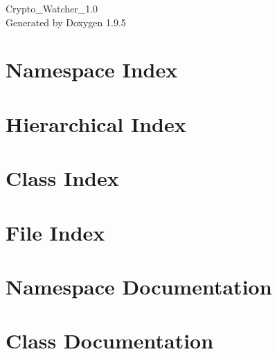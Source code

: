 \documentclass[twoside]{book}
\newcommand{\+}{\discretionary{\mbox{\scriptsize$\hookleftarrow$}}{}{}}
\newcommand{\clearemptydoublepage}{%
    \newpage{\pagestyle{empty}\cleardoublepage}%
  }
\begin{document}
  \raggedbottom
  \begin{titlepage}
  \vspace*{7cm}
  \begin{center}%
  {\Large Crypto\+\_\+\+Watcher\+\_\+1.\+0}\\
  \vspace*{1cm}
  {\large Generated by Doxygen 1.9.5}\\
  \end{center}
  \end{titlepage}
  \clearemptydoublepage
  \tableofcontents
  \clearemptydoublepage
\chapter{Namespace Index}

\chapter{Hierarchical Index}

\chapter{Class Index}

\chapter{File Index}

\chapter{Namespace Documentation}









\chapter{Class Documentation}














\end{document}
